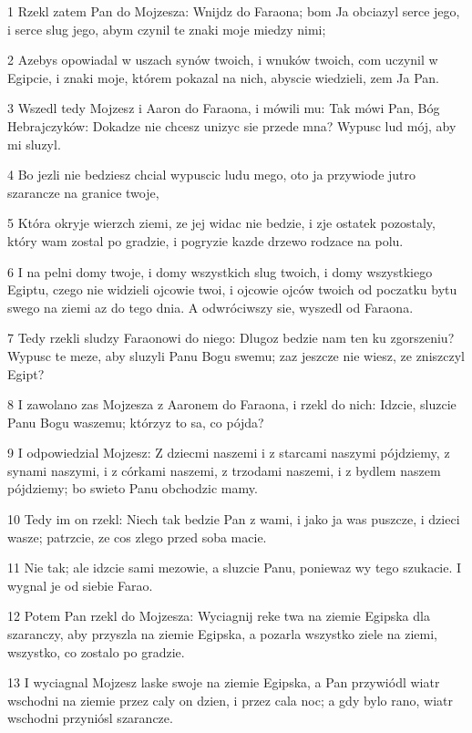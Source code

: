 \par 1 Rzekl zatem Pan do Mojzesza: Wnijdz do Faraona; bom Ja obciazyl serce jego, i serce slug jego, abym czynil te znaki moje miedzy nimi;
\par 2 Azebys opowiadal w uszach synów twoich, i wnuków twoich, com uczynil w Egipcie, i znaki moje, którem pokazal na nich, abyscie wiedzieli, zem Ja Pan.
\par 3 Wszedl tedy Mojzesz i Aaron do Faraona, i mówili mu: Tak mówi Pan, Bóg Hebrajczyków: Dokadze nie chcesz unizyc sie przede mna? Wypusc lud mój, aby mi sluzyl.
\par 4 Bo jezli nie bedziesz chcial wypuscic ludu mego, oto ja przywiode jutro szarancze na granice twoje,
\par 5 Która okryje wierzch ziemi, ze jej widac nie bedzie, i zje ostatek pozostaly, który wam zostal po gradzie, i pogryzie kazde drzewo rodzace na polu.
\par 6 I na pelni domy twoje, i domy wszystkich slug twoich, i domy wszystkiego Egiptu, czego nie widzieli ojcowie twoi, i ojcowie ojców twoich od poczatku bytu swego na ziemi az do tego dnia. A odwróciwszy sie, wyszedl od Faraona.
\par 7 Tedy rzekli sludzy Faraonowi do niego: Dlugoz bedzie nam ten ku zgorszeniu? Wypusc te meze, aby sluzyli Panu Bogu swemu; zaz jeszcze nie wiesz, ze zniszczyl Egipt?
\par 8 I zawolano zas Mojzesza z Aaronem do Faraona, i rzekl do nich: Idzcie, sluzcie Panu Bogu waszemu; którzyz to sa, co pójda?
\par 9 I odpowiedzial Mojzesz: Z dziecmi naszemi i z starcami naszymi pójdziemy, z synami naszymi, i z córkami naszemi, z trzodami naszemi, i z bydlem naszem pójdziemy; bo swieto Panu obchodzic mamy.
\par 10 Tedy im on rzekl: Niech tak bedzie Pan z wami, i jako ja was puszcze, i dzieci wasze; patrzcie, ze cos zlego przed soba macie.
\par 11 Nie tak; ale idzcie sami mezowie, a sluzcie Panu, poniewaz wy tego szukacie. I wygnal je od siebie Farao.
\par 12 Potem Pan rzekl do Mojzesza: Wyciagnij reke twa na ziemie Egipska dla szaranczy, aby przyszla na ziemie Egipska, a pozarla wszystko ziele na ziemi, wszystko, co zostalo po gradzie.
\par 13 I wyciagnal Mojzesz laske swoje na ziemie Egipska, a Pan przywiódl wiatr wschodni na ziemie przez caly on dzien, i przez cala noc; a gdy bylo rano, wiatr wschodni przyniósl szarancze.
